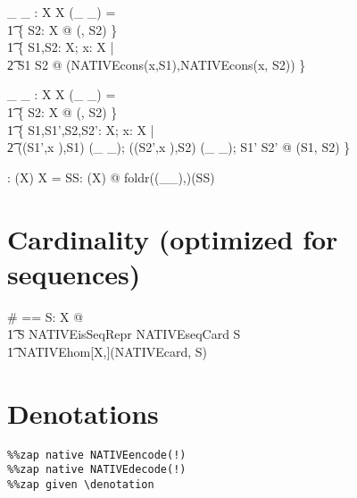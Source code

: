 \documentclass{article}
\begin{document}
\begin{axdef}[X]
   \_ \prefix \_ : \assumed \seq X \rel \seq X
\where
  (\_ \prefix \_) = \\\t1
     \{ S2: \assumed \seq X @ (\emptyset, S2) \} \cup \\\t1
     \{ S1,S2: \assumed \seq X; x: \assumed X | \\\t2
         S1 \prefix S2 @ (NATIVEcons(x,S1),NATIVEcons(x, S2)) \}
\end{axdef}

\begin{axdef}[X]
   \_ \suffix \_ : \assumed \seq X \rel \seq X
\where
  (\_ \suffix \_) = \\\t1
     \{ S2: \assumed \seq X @ (\emptyset, S2) \} \cup \\\t1
     \{ S1,S1',S2,S2': \assumed \seq X; x: \assumed X | \\\t2
         ((S1',\langle x \rangle),S1) \in (\_ \cat \_); 
         ((S2',\langle x \rangle),S2) \in (\_ \cat \_); 
         S1' \suffix S2' @
        (S1, S2) \}
\end{axdef}

\begin{axdef}[X]
   \dcat: \assumed \seq (\seq X) \fun \seq X 
\where
   \dcat = \lambda SS: \assumed \seq(\seq X) @
            foldr((\_\cat\_),\emptyset)(SS)
\end{axdef}


\section{Cardinality (optimized for sequences)}

\begin{axdef}[X]
   \# == \lambda S: \assumed \finset X @ \\\t1
             \IF S \in NATIVEisSeqRepr \THEN NATIVEseqCard S \\\t1
             \ELSE NATIVEhom[X,\baseNum](NATIVEcard, S)
\end{axdef}




\section{Denotations}

\begin{verbatim}
%%zap native NATIVEencode(!) 
%%zap native NATIVEdecode(!) 
%%zap given \denotation
\end{verbatim}
\end{document}
